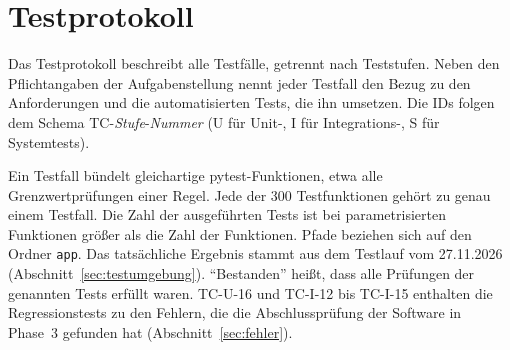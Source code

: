 \newcommand{\pyt}[1]{{\urlstyle{tt}\nolinkurl{#1}}}
\newcommand{\testfall}[8]{%
  \textbf{Testfall-ID} & \textbf{#1} \\*
  Kurzbeschreibung & #2 \\*
  Bezug & #3 \\*
  Automatisierung & #4 \\*
  Vorbedingungen & #5 \\*
  Eingabedaten und Aktionen & #6 \\*
  Erwartetes Ergebnis & #7 \\*
  Tatsächliches Ergebnis & #8 \\}
\newcommand{\protokollkopf}[2]{%
  \caption{#1}\label{#2}\\
  \toprule
  \endfirsthead
  \toprule
  \endhead
  \bottomrule
  \endfoot}

\section{Testprotokoll}\label{sec:testprotokoll}
Das Testprotokoll beschreibt alle Testfälle, getrennt nach Teststufen. Neben den Pflichtangaben der Aufgabenstellung nennt jeder Testfall den Bezug zu den Anforderungen und die automatisierten Tests, die ihn umsetzen. Die IDs folgen dem Schema TC-\textit{Stufe}-\textit{Nummer} (U für Unit-, I für Integrations-, S für Systemtests).

Ein Testfall bündelt gleichartige pytest-Funktionen, etwa alle Grenzwertprüfungen einer Regel. Jede der 300 Testfunktionen gehört zu genau einem Testfall. Die Zahl der ausgeführten Tests ist bei parametrisierten Funktionen größer als die Zahl der Funktionen. Pfade beziehen sich auf den Ordner \texttt{app}. Das tatsächliche Ergebnis stammt aus dem Testlauf vom 27.11.2026 (Abschnitt~\ref{sec:testumgebung}). \enquote{Bestanden} heißt, dass alle Prüfungen der genannten Tests erfüllt waren. TC-U-16 und TC-I-12 bis TC-I-15 enthalten die Regressionstests zu den Fehlern, die die Abschlussprüfung der Software in Phase~3 gefunden hat (Abschnitt~\ref{sec:fehler}).

